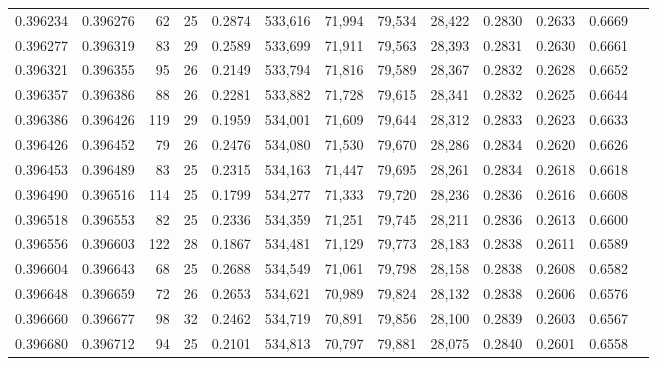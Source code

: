\begin{tabular}{rrrrrrrrrrrrr}
0.396234 & 0.396276 &    62 &  25 &                                     0.2874 & 533,616 &  71,994 &  79,534 &  28,422 & 0.2830 & 0.2633 & 0.6669 \\
0.396277 & 0.396319 &    83 &  29 &                                     0.2589 & 533,699 &  71,911 &  79,563 &  28,393 & 0.2831 & 0.2630 & 0.6661 \\
0.396321 & 0.396355 &    95 &  26 &                                     0.2149 & 533,794 &  71,816 &  79,589 &  28,367 & 0.2832 & 0.2628 & 0.6652 \\
0.396357 & 0.396386 &    88 &  26 &                                     0.2281 & 533,882 &  71,728 &  79,615 &  28,341 & 0.2832 & 0.2625 & 0.6644 \\
0.396386 & 0.396426 &   119 &  29 &                                     0.1959 & 534,001 &  71,609 &  79,644 &  28,312 & 0.2833 & 0.2623 & 0.6633 \\
0.396426 & 0.396452 &    79 &  26 &                                     0.2476 & 534,080 &  71,530 &  79,670 &  28,286 & 0.2834 & 0.2620 & 0.6626 \\
0.396453 & 0.396489 &    83 &  25 &                                     0.2315 & 534,163 &  71,447 &  79,695 &  28,261 & 0.2834 & 0.2618 & 0.6618 \\
0.396490 & 0.396516 &   114 &  25 &                                     0.1799 & 534,277 &  71,333 &  79,720 &  28,236 & 0.2836 & 0.2616 & 0.6608 \\
0.396518 & 0.396553 &    82 &  25 &                                     0.2336 & 534,359 &  71,251 &  79,745 &  28,211 & 0.2836 & 0.2613 & 0.6600 \\
0.396556 & 0.396603 &   122 &  28 &                                     0.1867 & 534,481 &  71,129 &  79,773 &  28,183 & 0.2838 & 0.2611 & 0.6589 \\
0.396604 & 0.396643 &    68 &  25 &                                     0.2688 & 534,549 &  71,061 &  79,798 &  28,158 & 0.2838 & 0.2608 & 0.6582 \\
0.396648 & 0.396659 &    72 &  26 &                                     0.2653 & 534,621 &  70,989 &  79,824 &  28,132 & 0.2838 & 0.2606 & 0.6576 \\
0.396660 & 0.396677 &    98 &  32 &                                     0.2462 & 534,719 &  70,891 &  79,856 &  28,100 & 0.2839 & 0.2603 & 0.6567 \\
0.396680 & 0.396712 &    94 &  25 &                                     0.2101 & 534,813 &  70,797 &  79,881 &  28,075 & 0.2840 & 0.2601 & 0.6558 \\

\end{tabular}
